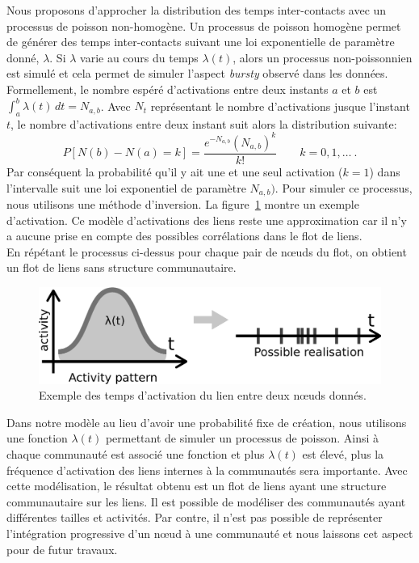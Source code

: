 Nous proposons d'approcher la distribution des temps inter-contacts avec un processus de poisson non-homogène.
Un processus de poisson homogène permet de générer des temps inter-contacts suivant une loi exponentielle de paramètre donné, $\lambda$.
Si $\lambda$ varie au cours du temps $\lambda(t)$, alors un processus non-poissonnien est simulé et cela permet de simuler l'aspect \emph{bursty} observé dans les données.
Formellement, le nombre espéré d'activations entre deux instants $a$ et $b$ est $\int_a^b \lambda(t)\,dt=N_{a,b}$.
Avec $N_t$ représentant le nombre d'activations jusque l'instant $t$, le nombre d'activations entre deux instant suit alors la distribution suivante:
\begin{equation}
P [N(b) - N(a) = k] = \frac{e^{-N_{a,b}} (N_{a,b})^k}{k!} \qquad k= 0,1,\ldots \ .
\end{equation}
Par conséquent la probabilité qu'il y ait une et une seul activation ($k=1$) dans l'intervalle suit une loi exponentiel de paramètre $N_{a,b})$.
Pour simuler ce processus, nous utilisons une méthode d'inversion.
La figure~\ref{fig:qualite_Activation} montre un exemple d'activation.
Ce modèle d'activations des liens reste une approximation car il n'y a aucune prise en compte des possibles corrélations dans le flot de liens. \\
En répétant le processus ci-dessus pour chaque pair de n\oe uds du flot, on obtient un flot de liens sans structure communautaire.


\begin{figure}
\centering
\includegraphics[width=0.7\linewidth]{img/Qualite/Activation}
\caption{Exemple des temps d'activation du lien entre deux n\oe uds donnés.}
\label{fig:qualite_Activation}
\end{figure}





Dans notre modèle au lieu d'avoir une probabilité fixe de création, nous utilisons une fonction $\lambda(t)$ permettant de simuler un processus de poisson.
Ainsi à chaque communauté est associé une fonction et plus $\lambda(t)$ est élevé, plus la fréquence d'activation des liens internes à la communautés sera importante.
Avec cette modélisation, le résultat obtenu est un flot de liens ayant une structure communautaire sur les liens.
Il est possible de modéliser des communautés ayant différentes tailles et activités.
Par contre, il n'est pas possible de représenter l'intégration progressive d'un n\oe ud à une communauté et nous laissons cet aspect pour de futur travaux.



